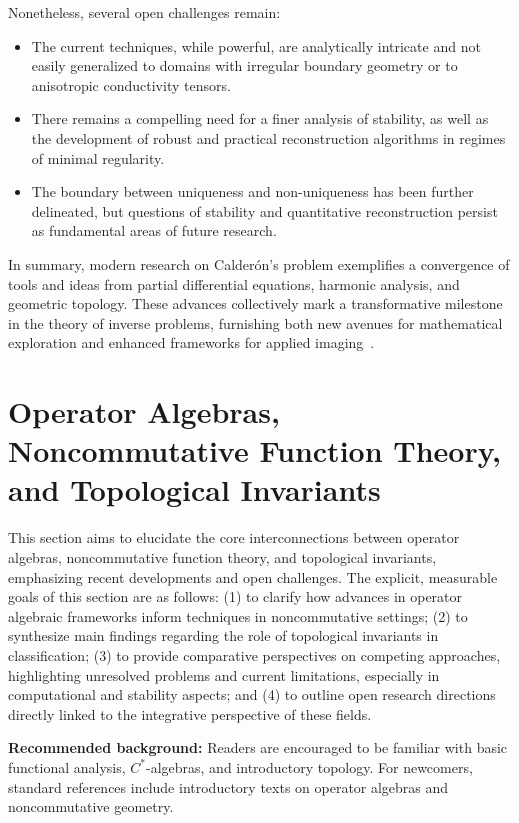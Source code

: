 \documentclass[sigconf]{acmart}
\begin{document}
Nonetheless, several open challenges remain:

\begin{itemize}
    \item The current techniques, while powerful, are analytically intricate and not easily generalized to domains with irregular boundary geometry or to anisotropic conductivity tensors.
    \item There remains a compelling need for a finer analysis of stability, as well as the development of robust and practical reconstruction algorithms in regimes of minimal regularity.
    \item The boundary between uniqueness and non-uniqueness has been further delineated, but questions of stability and quantitative reconstruction persist as fundamental areas of future research.
\end{itemize}

In summary, modern research on Calderón's problem exemplifies a convergence of tools and ideas from partial differential equations, harmonic analysis, and geometric topology. These advances collectively mark a transformative milestone in the theory of inverse problems, furnishing both new avenues for mathematical exploration and enhanced frameworks for applied imaging~\cite{ref102}.

\section{Operator Algebras, Noncommutative Function Theory, and Topological Invariants}
This section aims to elucidate the core interconnections between operator algebras, noncommutative function theory, and topological invariants, emphasizing recent developments and open challenges. The explicit, measurable goals of this section are as follows: (1) to clarify how advances in operator algebraic frameworks inform techniques in noncommutative settings; (2) to synthesize main findings regarding the role of topological invariants in classification; (3) to provide comparative perspectives on competing approaches, highlighting unresolved problems and current limitations, especially in computational and stability aspects; and (4) to outline open research directions directly linked to the integrative perspective of these fields.

\textbf{Recommended background:} Readers are encouraged to be familiar with basic functional analysis, $C^*$-algebras, and introductory topology. For newcomers, standard references include introductory texts on operator algebras and noncommutative geometry.
\end{document}
